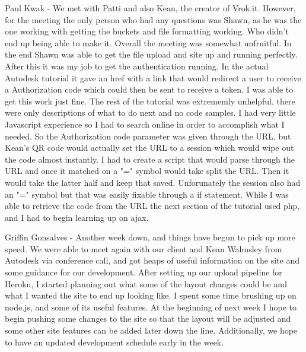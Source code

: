 \documentclass[10pt,draftclsnofoot,onecolumn]{IEEEtran}
\begin{document}
Paul Kwak - We met with Patti and also Kean, the creator of Vrok.it. However, for the meeting the only person who had any questions was Shawn, as he was the one working with getting the buckets and file formatting working. Who didn't end up being able to make it. Overall the meeting was somewhat unfruitful. In the end Shawn was able to get the file upload and site up and running perfectly. After this it was my job to get the authentication running. In the actual Autodesk tutorial it gave an href with a link that would redirect a user to receive a Authorization code which could then be sent to receive a token. I was able to get this work just fine. The rest of the tutorial was extrememly unhelpful, there were only descriptions of what to do next and no code samples. I had very little Javascript experience so I had to search online in order to accomplish what I needed. So the Authorization code parameter was given through the URL, but Kean's QR code would actually set the URL to a session which would wipe out the code almost instantly. I had to create a script that would parse through the URL and once it matched on a "=" symbol would take split the URL. Then it would take the latter half and keep that saved. Unforunately the session also had an "=" symbol but that was easily fixable through a if statement. While I was able to retrieve the code from the URL the next section of the tutorial used php, and I had to begin learning up on ajax.

Griffin Gonsalves - Another week down, and things have begun to pick up more speed. We were able to meet again with our client and Kean Walmsley from Autodesk via conference call, and got heaps of useful information on the site and some guidance for our development. After setting up our upload pipeline for Heroku, I started planning out what some of the layout changes could be and what I wanted the site to end up looking like. I spent some time brushing up on node.js, and some of its useful features. At the beginning of next week I hope to begin pushing some changes to the site so that the layout will be adjusted and some other site features can be added later down the line. Additionally, we hope to have an updated development schedule early in the week.
\end{document}
